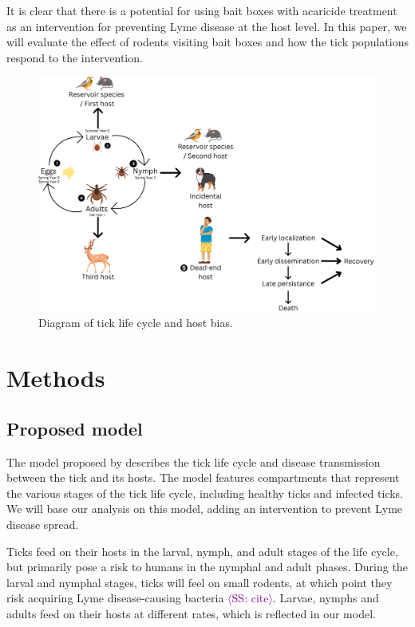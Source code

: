 \documentclass[12pt, centerh1]{article}
\newcommand{\sophie}[1]{{\textcolor{purple}{$\langle$SS: #1$\rangle$}}}
\begin{document}
It is clear that there is a potential for using bait boxes with acaricide treatment as an intervention for preventing Lyme disease at the host level. In this paper, we will evaluate the effect of rodents visiting bait boxes and how the tick populations respond to the intervention.



\begin{figure}[h]
    \centering
    \includegraphics[scale = 0.15]{figures/Tick life cycle and progression of lyme disease.png}
    \caption{Diagram of tick life cycle and host bias.}
    \label{fig:lifecycle}
\end{figure}

\section{Methods}

\subsection{Proposed model}
The model proposed by \citet{lou2014tick} describes the tick life cycle and disease transmission between the tick and its hosts. The model features compartments that represent the various stages of the tick life cycle, including healthy ticks and infected ticks. We will base our analysis on this model, adding an intervention to prevent Lyme disease spread.

Ticks feed on their hosts in the larval, nymph, and adult stages of the life cycle, but primarily pose a risk to humans in the nymphal and adult phases. During the larval and nymphal stages, ticks will feel on small rodents, at which point they risk acquiring Lyme disease-causing bacteria \sophie{cite}. Larvae, nymphs and adults feed on their hosts at different rates, which is reflected in our model. 
\end{document}
